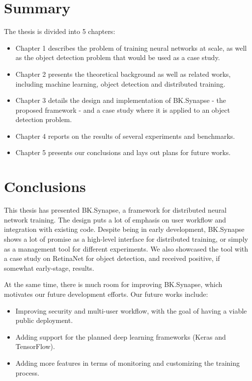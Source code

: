 \documentclass[a4paper, 12pt, oneside]{report}
\begin{document}
\chapter*{Summary}
The thesis is divided into 5 chapters:
\begin{itemize}
    \item Chapter 1 describes the problem of training neural networks at scale, as well as the object detection problem that would be used as a case study.
    \item Chapter 2 presents the theoretical background as well as related works, including machine learning, object detection and distributed training.
    \item Chapter 3 details the design and implementation of BK.Synapse - the proposed framework - and a case study where it is applied to an object detection problem.
    \item Chapter 4 reports on the results of several experiments and benchmarks.
    \item Chapter 5 presents our conclusions and lays out plans for future works.
\end{itemize}

\pagebreak
{}
\tableofcontents
\pagebreak
{}
\setcounter{page}{1}
\listoffigures
\listoftables

\printglossary[type=\acronymtype,style=long, title=List of Abbreviations]
\printglossary
\pagebreak



\pagebreak



\chapter{Conclusions}
This thesis has presented BK.Synapse, a framework for distributed neural network training. The design puts a lot of emphasis on user workflow and integration with existing code. Despite being in early development, BK.Synapse shows a lot of promise as a high-level interface for distributed training, or simply as a management tool for different experiments. We also showcased the tool with a case study on RetinaNet for object detection, and received positive, if somewhat early-stage, results.

At the same time, there is much room for improving BK.Synapse, which motivates our future development efforts. Our future works include:
\begin{itemize}
    \item Improving security and multi-user workflow, with the goal of having a viable public deployment.
    \item Adding support for the planned deep learning frameworks (Keras and TensorFlow).
    \item Adding more features in terms of monitoring and customizing the training process.
\end{itemize}

\pagebreak



\end{document}
